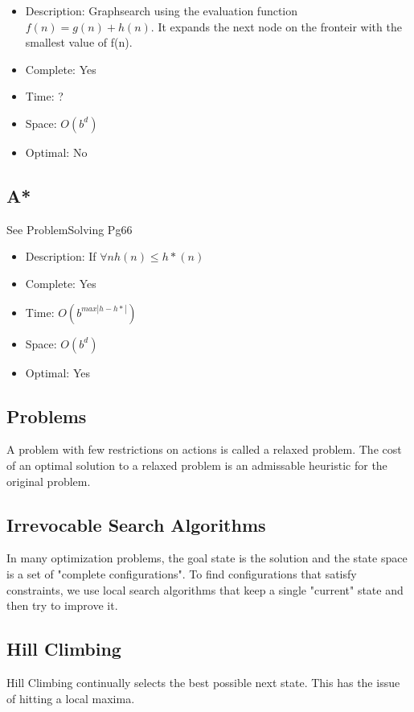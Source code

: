 \documentclass[11pt, oneside]{article}   	%
\begin{document}
\begin{itemize}
\item Description: Graphsearch using the evaluation function $f(n) = g(n) + h(n)$. It expands the next node on the fronteir with the smallest value of f(n).
\item Complete: Yes
\item Time: ?
\item Space: $O(b^d)$
\item Optimal: No
\end{itemize}

\subsection{A*}
See ProblemSolving Pg66
\begin{itemize}
\item Description: If $\forall n h(n) \leq h*(n)$
\item Complete: Yes
\item Time: $O(b^{max|h-h*|})$
\item Space: $O(b^d)$
\item Optimal: Yes
\end{itemize}

\subsection{Problems}

A problem with few restrictions on actions is called a relaxed problem. The cost of an optimal solution to a relaxed problem is an admissable heuristic for the original problem.

\subsection{Irrevocable Search Algorithms}

In many optimization problems, the goal state is the solution and the state space is a set of "complete configurations". To find configurations that satisfy constraints, we use local search algorithms that keep a single "current" state and then try to improve it.

\subsection{Hill Climbing}

Hill Climbing continually selects the best possible next state. This has the issue of hitting a local maxima.
\end{document}
